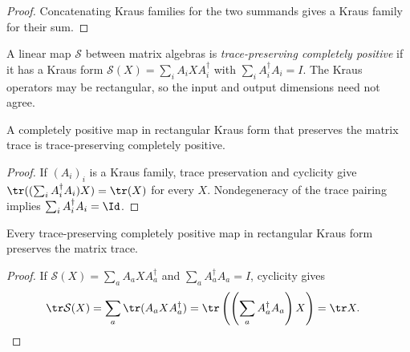 \begin{proof}\leanok
    Concatenating Kraus families for the two summands gives a Kraus family for
    their sum.
\end{proof}

\begin{definition}
    \label{def:is_kraus_cptp}
    \leanok
    A linear map $\mathcal{S}$ between matrix algebras is \emph{trace-preserving
        completely positive} if it has a Kraus form
    $\mathcal{S}(X)=\sum_i A_iXA_i^\dagger$ with
    $\sum_i A_i^\dagger A_i=I$. The Kraus operators may be rectangular, so the
    input and output dimensions need not agree.
\end{definition}

\begin{theorem}
    \label{thm:is_kraus_cptp_of_is_kraus_cp_trace_preserving}
    \leanok
    A completely positive map in rectangular Kraus form that preserves the
    matrix trace is trace-preserving completely positive.
\end{theorem}

\begin{proof}\leanok
    If $(A_i)_i$ is a Kraus family, trace preservation and cyclicity give
    $\tr((\sum_i A_i^\dagger A_i)X)=\tr(X)$ for every $X$.
    Nondegeneracy of the trace pairing implies
    $\sum_i A_i^\dagger A_i=\Id$.
\end{proof}

\begin{theorem}
    \label{thm:is_kraus_cptp_trace_map}
    \leanok
    Every trace-preserving completely positive map in rectangular Kraus form
    preserves the matrix trace.
\end{theorem}

\begin{proof}
    \leanok
    If $\mathcal S(X)=\sum_a A_aXA_a^\dagger$ and
    $\sum_a A_a^\dagger A_a=I$, cyclicity gives
    \begin{align}
        \tr\mathcal S(X)
        &=\sum_a\tr(A_aXA_a^\dagger)
          =\tr\left(\left(\sum_a A_a^\dagger A_a\right)X\right)
          =\tr X.
        \notag
    \end{align}
\end{proof}

